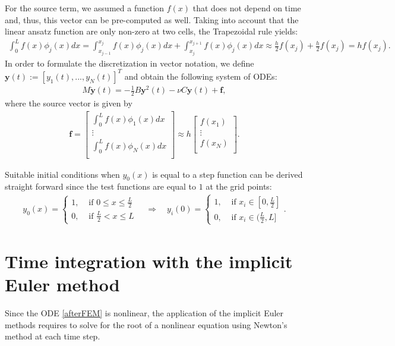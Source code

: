 For the source term, we assumed a function $f(x)$ that does not depend on time and, thus, this vector can be pre-computed as well. Taking into account that the linear ansatz function are only non-zero at two cells, the Trapezoidal rule \cite{B06} yields:
\begin{align*}
\int_0^L f(x) \phi_j(x) dx = \int_{x_{j-1}}^{x_{j}} f(x) \phi_j(x) dx + \int_{x_{j}}^{x_{j+1}} f(x) \phi_j(x) dx \approx \frac{h}{2} f(x_j) + \frac{h}{2} f(x_j) = h f(x_j).
\end{align*}
In order to formulate the discretization in vector notation, we define $\mathbf{y}(t) := [y_1(t),...,y_N(t)]^T$ and obtain the following system of ODEs:
\begin{align}
\label{afterFEM}
M \mathbf{\dot y}(t) = -\frac{1}{2} B \mathbf{y}^2(t) - \nu C \mathbf{y}(t) + \mathbf{f},
\end{align}
where the source vector is given by
\begin{align*}
\mathbf{f} = \begin{bmatrix} \int_0^L f(x) \phi_1(x) dx \\ \vdots \\ \int_0^L f(x) \phi_N(x) dx\\ \end{bmatrix} \approx h \begin{bmatrix} f(x_1) \\ \vdots \\ f(x_N)\\ \end{bmatrix}.
\end{align*}

Suitable initial conditions when $y_0(x)$ is equal to a step function can be derived straight forward since the test functions are equal to $1$ at the grid points:
\begin{align*}
y_0(x) = \begin{cases} 1, & \text{ if } 0 \leq x \leq \frac{L}{2} \\ 0, & \text{ if } \frac{L}{2} < x \leq L \end{cases} \quad \Rightarrow \quad y_i(0) = \begin{cases} 1, & \text{ if } x_i \in [0,\frac{L}{2}] \\ 0, & \text{ if } x_i \in (\frac{L}{2},L] \end{cases}.
\end{align*}
\section{Time integration with the implicit Euler method}
\label{implEuler}
Since the ODE \eqref{afterFEM} is nonlinear, the application of the implicit Euler methods requires to solve for the root of a nonlinear equation using Newton's method at each time step.

